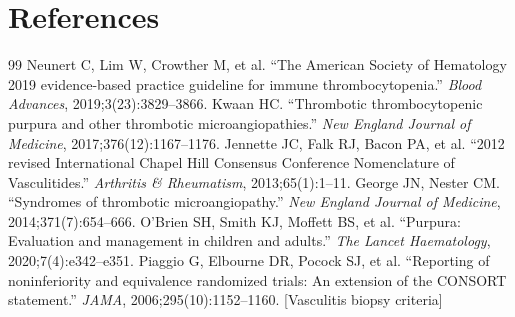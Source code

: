 \section*{References}
\begin{thebibliography}{99}
 Neunert C, Lim W, Crowther M, et al. ``The American Society of Hematology 2019 evidence-based practice guideline for immune thrombocytopenia.'' \textit{Blood Advances}, 2019;3(23):3829--3866.
 Kwaan HC. ``Thrombotic thrombocytopenic purpura and other thrombotic microangiopathies.'' \textit{New England Journal of Medicine}, 2017;376(12):1167--1176.
 Jennette JC, Falk RJ, Bacon PA, et al. ``2012 revised International Chapel Hill Consensus Conference Nomenclature of Vasculitides.'' \textit{Arthritis \& Rheumatism}, 2013;65(1):1--11.
 George JN, Nester CM. ``Syndromes of thrombotic microangiopathy.'' \textit{New England Journal of Medicine}, 2014;371(7):654--666.
 O'Brien SH, Smith KJ, Moffett BS, et al. ``Purpura: Evaluation and management in children and adults.'' \textit{The Lancet Haematology}, 2020;7(4):e342--e351.
 Piaggio G, Elbourne DR, Pocock SJ, et al. ``Reporting of noninferiority and equivalence randomized trials: An extension of the CONSORT statement.'' \textit{JAMA}, 2006;295(10):1152--1160. [Vasculitis biopsy criteria]
\end{thebibliography}
